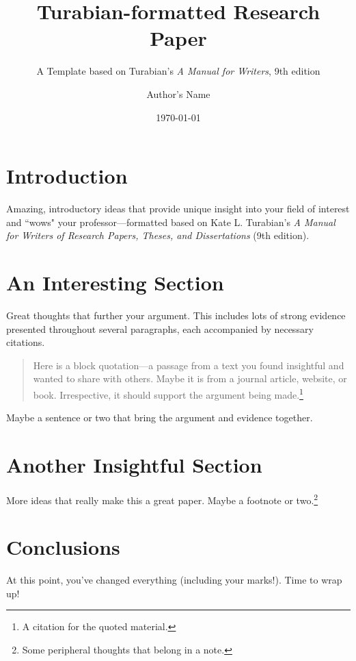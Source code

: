 \documentclass{turabian-researchpaper}
\title{Turabian-formatted Research Paper}
\subtitle{A Template based on Turabian's \emph{A Manual for Writers}, 9th edition}
\author{Author's Name}
\date{\today}
\begin{document}
\maketitle


\section{Introduction}

Amazing, introductory ideas that provide unique insight into your field of interest and ``wows" your professor---formatted based on Kate L. Turabian's \emph{A Manual for Writers of Research Papers, Theses, and Dissertations} (9th edition).


\section{An Interesting Section}

Great thoughts that further your argument. This includes lots of strong evidence presented throughout several paragraphs, each accompanied by necessary citations.
\begin{quotation}
    \noindent Here is a block quotation---a passage from a text you found insightful and wanted to share with others. Maybe it is from a journal article, website, or book. Irrespective, it should support the argument being made.\footnote{A citation for the quoted material.}
\end{quotation}
Maybe a sentence or two that bring the argument and evidence together.\autocite[34]{example_source}


\section{Another Insightful Section}

More ideas that really make this a great paper. Maybe a footnote or two.\footnote{Some peripheral thoughts that belong in a note.}


\section{Conclusions}

At this point, you've changed everything (including your marks!). Time to wrap up!


\clearpage
\printbibliography
\end{document}
